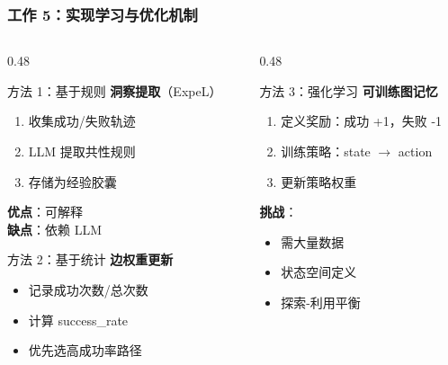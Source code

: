 \documentclass[aspectratio=169,10pt]{beamer}
\begin{document}
\begin{frame}
  \frametitle{工作 5：实现学习与优化机制}

  \begin{columns}[T]
    \begin{column}{0.48\textwidth}
      \begin{block}{方法 1：基于规则}
        \footnotesize
        \textbf{洞察提取}（ExpeL）
        \begin{enumerate}
          \item 收集成功/失败轨迹
          \item LLM 提取共性规则
          \item 存储为经验胶囊
        \end{enumerate}

        \vspace{0.1cm}

        \textbf{优点}：可解释\\
        \textbf{缺点}：依赖 LLM
      \end{block}

      \vspace{0.15cm}

      \begin{block}{方法 2：基于统计}
        \footnotesize
        \textbf{边权重更新}
        \begin{itemize}
          \item 记录成功次数/总次数
          \item 计算 success\_rate
          \item 优先选高成功率路径
        \end{itemize}
      \end{block}
    \end{column}

    \begin{column}{0.48\textwidth}
      \begin{block}{方法 3：强化学习}
        \footnotesize
        \textbf{可训练图记忆}
        \begin{enumerate}
          \item 定义奖励：成功 +1，失败 -1
          \item 训练策略：state $\rightarrow$ action
          \item 更新策略权重
        \end{enumerate}

        \vspace{0.1cm}

        \textbf{挑战}：
        \begin{itemize}
          \item 需大量数据
          \item 状态空间定义
          \item 探索-利用平衡
        \end{itemize}
      \end{block}
    \end{column}
  \end{columns}


\end{frame}
\end{document}
